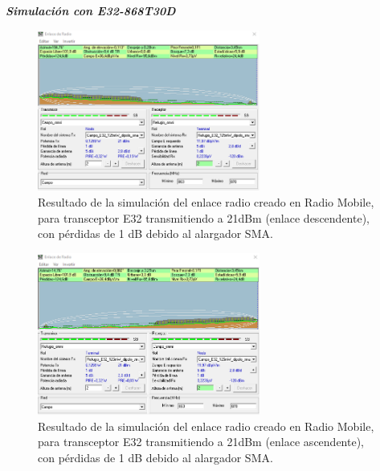\documentclass[12pt]{article}
\begin{document}
	\noindent \textit{\textbf{Simulación con E32-868T30D}} \\
	
	\begin{figure}[h]
		\begin{center}
			\includegraphics[width=0.65\textwidth]{img/resultado_e32_125mW_conPerdidas_desc.png}
			\caption{Resultado de la simulación del enlace radio creado en Radio Mobile, para transceptor E32 transmitiendo a 21dBm (enlace descendente), con pérdidas de 1 dB debido al alargador SMA.}
			\label{fig: resultado enlace e32 125mW descendente con perdidas radio mobile}
		\end{center}
	\end{figure}
	
	\pagebreak
	
	
	\begin{figure}[h]
		\begin{center}
			\includegraphics[width=0.65\textwidth]{img/resultado_e32_125mW_conPerdidas_asc.png}
			\caption{Resultado de la simulación del enlace radio creado en Radio Mobile, para transceptor E32 transmitiendo a 21dBm (enlace ascendente), con pérdidas de 1 dB debido al alargador SMA.}
			\label{fig: resultado enlace e32 125mW ascendente con perdidas radio mobile}
		\end{center}
	\end{figure}
\end{document}
